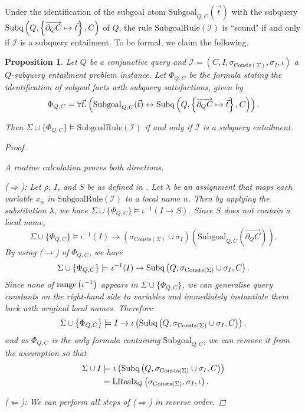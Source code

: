 \documentclass[12pt]{report}
\theoremstyle{plain}
\newtheorem{proposition}[theorem]{Proposition}
\theoremstyle{definition}
\def\Consts{{\mathrm{Consts}}}
\newcommand{\range}[1]{\ensuremath{\normalfont{\operatorname{range}} \left( #1 \right)}}
\newcommand{\Subq}[3]{\ensuremath{\normalfont{\textrm{Subq}} \left( #1, #2, #3 \right)}}
\newcommand{\LRealz}[2]{\ensuremath{\normalfont{\textrm{LRealz}}_{ #1 } \left( #2 \right)}}
\begin{document}
Under the identification of the subgoal atom $\mathrm{Subgoal}_{Q, C}(\vec{t})$ with the subquery $\Subq{Q}{\left\{ \overrightarrow{\partial_Q C} \mapsto \vec{t} \right\}}{C}$ of $Q$, the rule $\mathrm{SubgoalRule}(\mathcal{I})$ is ``sound" if and only if $\mathcal{I}$ is a subquery entailment. To be formal, we claim the following.

\begin{proposition}
\label{subgoal-captures-subquery-fulfilment}
  Let $Q$ be a conjunctive query and $\mathcal{I} = (C, I, \sigma_{\Consts(\Sigma)}, \sigma_I, \iota)$ a $Q$-subquery entailment problem instance. Let $\Phi_{Q, C}$ be the formula stating the identification of subgoal facts with subquery satisfactions, given by $$
    \Phi_{Q, C} = \forall \vec{t}. \left( \mathrm{Subgoal}_{Q,C}(\vec{t}) \leftrightarrow \Subq{Q}{\left\{ \overrightarrow{\partial_Q C} \mapsto \vec{t} \right\}}{C} \right).
  $$
  
  Then $\Sigma \cup \{ \Phi_{Q, C} \} \models \mathrm{SubgoalRule}(\mathcal{I})$ if and only if $\mathcal{I}$ is a subquery entailment.
  \begin{proof} $ $\par
    A routine calculation proves both directions.

    ($\Longrightarrow$):
      Let $\rho$, $I$, and $S$ be as defined in . Let $\lambda$ be an assignment that maps each variable $x_n$ in $\mathrm{SubgoalRule}(\mathcal{I})$ to a local name $n$. Then by applying the substitution $\lambda$, we have $\Sigma \cup \{ \Phi_{Q, C} \} \models \iota^{-1}(I \rightarrow S)$. Since $S$ does not contain a local name, $$
      \Sigma \cup \{ \Phi_{Q, C} \} \models \iota^{-1}(I) \rightarrow (\sigma_{\Consts(\Sigma)} \cup \sigma_I)\left(\mathrm{Subgoal}_{Q, C}\left(\overrightarrow{\partial_Q C}\right)\right).
      $$
      By using ($\rightarrow$) of $\Phi_{Q,C}$, we have
      $$
      \Sigma \cup \{ \Phi_{Q, C} \} \models \iota^{-1}(I) \rightarrow \Subq{Q}{\sigma_{\Consts(\Sigma)} \cup \sigma_I}{C}.
      $$
      Since none of $\range{\iota^{-1}}$ appears in $\Sigma \cup \{\Phi_{Q, C}\}$, we can generalise query constants on the right-hand side to variables and immediately instantiate them back with original local names. Therefore
      $$
      \Sigma \cup \{ \Phi_{Q, C} \} \models I \rightarrow \iota\left(\Subq{Q}{\sigma_{\Consts(\Sigma)} \cup \sigma_I}{C}\right),
      $$
      and as $\Phi_{Q, C}$ is the only formula containing $\mathrm{Subgoal}_{Q, C}$, we can remove it from the assumption so that \begin{align*}
        \Sigma \cup I
          &\models \iota\left(\Subq{Q}{\sigma_{\Consts(\Sigma)} \cup \sigma_I}{C}\right) \\
          &= \LRealz{Q}{\sigma_{\Consts(\Sigma)}, \sigma_I, \iota}.
      \end{align*}

    ($\Longleftarrow$): We can perform all steps of ($\Longrightarrow$) in reverse order.
  \end{proof}
\end{proposition}
\end{document}
